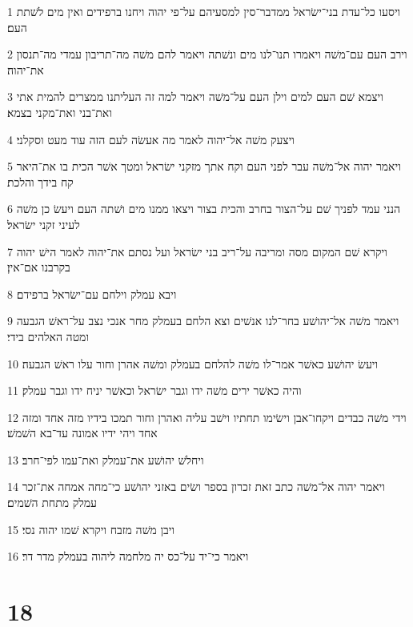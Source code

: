 \par 1 ויסעו כל־עדת בני־ישׂראל ממדבר־סין למסעיהם על־פי יהוה ויחנו ברפידים ואין מים לשׁתת העם׃
\par 2 וירב העם עם־משׁה ויאמרו תנו־לנו מים ונשׁתה ויאמר להם משׁה מה־תריבון עמדי מה־תנסון את־יהוה׃
\par 3 ויצמא שׁם העם למים וילן העם על־משׁה ויאמר למה זה העליתנו ממצרים להמית אתי ואת־בני ואת־מקני בצמא׃
\par 4 ויצעק משׁה אל־יהוה לאמר מה אעשׂה לעם הזה עוד מעט וסקלני׃
\par 5 ויאמר יהוה אל־משׁה עבר לפני העם וקח אתך מזקני ישׂראל ומטך אשׁר הכית בו את־היאר קח בידך והלכת׃
\par 6 הנני עמד לפניך שׁם על־הצור בחרב והכית בצור ויצאו ממנו מים ושׁתה העם ויעשׂ כן משׁה לעיני זקני ישׂראל׃
\par 7 ויקרא שׁם המקום מסה ומריבה על־ריב בני ישׂראל ועל נסתם את־יהוה לאמר הישׁ יהוה בקרבנו אם־אין׃
\par 8 ויבא עמלק וילחם עם־ישׂראל ברפידם׃
\par 9 ויאמר משׁה אל־יהושׁע בחר־לנו אנשׁים וצא הלחם בעמלק מחר אנכי נצב על־ראשׁ הגבעה ומטה האלהים בידי׃
\par 10 ויעשׂ יהושׁע כאשׁר אמר־לו משׁה להלחם בעמלק ומשׁה אהרן וחור עלו ראשׁ הגבעה׃
\par 11 והיה כאשׁר ירים משׁה ידו וגבר ישׂראל וכאשׁר יניח ידו וגבר עמלק׃
\par 12 וידי משׁה כבדים ויקחו־אבן וישׂימו תחתיו וישׁב עליה ואהרן וחור תמכו בידיו מזה אחד ומזה אחד ויהי ידיו אמונה עד־בא השׁמשׁ׃
\par 13 ויחלשׁ יהושׁע את־עמלק ואת־עמו לפי־חרב׃
\par 14 ויאמר יהוה אל־משׁה כתב זאת זכרון בספר ושׂים באזני יהושׁע כי־מחה אמחה את־זכר עמלק מתחת השׁמים׃
\par 15 ויבן משׁה מזבח ויקרא שׁמו יהוה נסי׃
\par 16 ויאמר כי־יד על־כס יה מלחמה ליהוה בעמלק מדר דר׃

\chapter{18}

